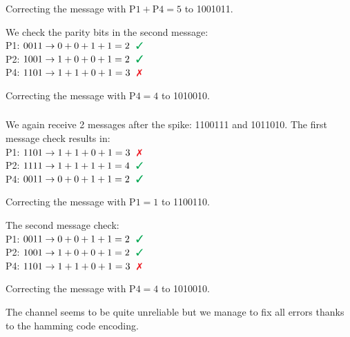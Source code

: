 \documentclass[12pt]{article}
\newcommand{\exercisepart}{\subsubsection{}}
\begin{document}
Correcting the message with $\text{P1} + \text{P4} = 5$ to 1001011.

\bigskip

We check the parity bits in the second message:
\\
P1: $0011 \rightarrow 0+0+1+1=2 \ \color{Green} \ \text{\ding{51}}$ \\
P2: $1001 \rightarrow 1+0+0+1=2 \ \color{Green} \ \text{\ding{51}}$ \\
P4: $1101 \rightarrow 1+1+0+1=3 \ \color{Red} \ \text{\ding{55}}$

Correcting the message with $\text{P4} = 4$ to 1010010.

\exercisepart
We again receive 2 messages after the spike: 1100111 and 1011010.
The first message check results in:
\\
P1: $1101 \rightarrow 1+1+0+1=3 \ \color{Red} \ \text{\ding{55}}$ \\
P2: $1111 \rightarrow 1+1+1+1=4 \ \color{Green} \ \text{\ding{51}}$ \\
P4: $0011 \rightarrow 0+0+1+1=2 \ \color{Green} \ \text{\ding{51}}$

Correcting the message with $\text{P1} = 1$ to 1100110.

\bigskip

The second message check:
\\
P1: $0011 \rightarrow 0+0+1+1=2 \ \color{Green} \ \text{\ding{51}}$ \\
P2: $1001 \rightarrow 1+0+0+1=2 \ \color{Green} \ \text{\ding{51}}$ \\
P4: $1101 \rightarrow 1+1+0+1=3 \ \color{Red} \ \text{\ding{55}}$

Correcting the message with $\text{P4} = 4$ to 1010010.

\bigskip

The channel seems to be quite unreliable but we manage to fix all errors thanks to the hamming code encoding.
\end{document}

